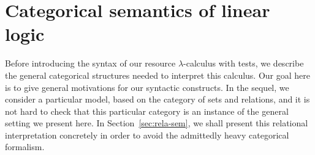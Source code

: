\documentclass{LMCS}
\newcommand{\lam}{\ensuremath{\lambda}}
\newcommand{\cI}{\mathcal{I}}
\newcommand{\cN}{\mathcal{N}}
\begin{document}
\newcommand\Tofval[1]{\left\langle#1\right\rangle}
\newcommand\Tofvalr[1]{\left\langle#1\right\rangle}
\newcommand\Tofvalrs[1]{\left\langle#1\right\rangle}
\newcommand\Tredv{\cN}
\newcommand\Simpl[2]{{#1}\multimap{#2}}

\newcommand\Softype[1]{#1^\bullet}

\newcommand\Cow{1}
\newcommand\Cbunch[2]{[#1]\cdot#2}
\newcommand\Cbunchp[2]{([#1]\cdot#2)}

\newcommand\Init[1]{\cI(#1)}
\newcommand\Downcl[1]{\mathord\downarrow#1}
\newcommand\Upcl[1]{\mathord\uparrow#1}
\newcommand\Downclr[2]{\mathord\downarrow_{#1}#2}
\newcommand\Upclr[2]{\mathord\uparrow_{#1}#2}

\newcommand\Substr{\sqsubseteq}

\newcommand\ScottU{U_{\mathsf S}}

\newcommand\Intint[1]{\underline{#1}}

\newcommand\Dsubstv[3]{\partial_{#3}(#1;#2)} 

\newcommand\Proofvskip{\\[2mm]}
\newcommand\Resofder[1]{{#1}^\circ}

\newcommand\Tlam{\Lambda_{\textsf t}}
\newcommand\Vlam{\Lambda_{\textsf v}}
\newcommand\Elam{\Lambda_{\textsf e}}
\newcommand\Qlam{\Lambda_{\textsf q}}

\newcommand\Canadd{\mathsf a}
\newcommand\Setofint[1]{\overline{#1}}
\newcommand\Permoflist[1]{\left\langle#1\right\rangle}

\newcommand\Termm{\mathsf t}
\newcommand\Family[3]{(#1)_{#2\in #3}}

\newcommand\Extiso{\mathsf e}

\newcommand\Poweb[1]{\langle#1\rangle}
\newcommand\Wpoweb[1]{\Web{\!\Poweb{#1}\!}}
\newcommand\Realize[1]{\Vdash_{#1}}

\newcommand\Relcbv{\mathcal U}
\newcommand\Polrcbv{\mathcal U_{\mathsf S}}

\newcommand\Relofpop{\rho}
\newcommand\Polofpop{\sigma}

\newcommand\Appro{\mathsf{app}}
\newcommand\Lamro{\mathsf{lam}}

\newcommand\Mix{\mathsf{mix}}
\newcommand\Mixn[1]{\Mix^{(#1)}}










 \section{Categorical semantics of linear logic}\label{sec:thomas}
Before introducing the syntax of our resource \lam-calculus with tests, we
describe the general categorical structures needed to interpret this
calculus. Our goal here is to give general motivations for our syntactic
constructs. In the sequel, we consider a particular model, based on the category
of sets and relations, and it is not hard to check that this particular
category is an instance of the general setting we present here. In
Section~\ref{sec:rela-sem}, we shall present this relational
interpretation concretely in order to avoid the admittedly heavy categorical
formalism.
\end{document}
